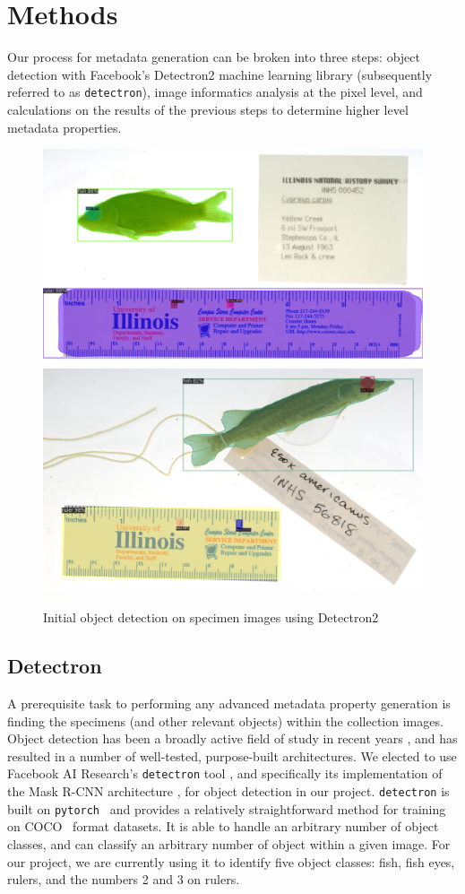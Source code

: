 \documentclass[conference]{IEEEtran}
\begin{document}
\section{Methods}
Our process for metadata generation can be broken into three steps: object detection with Facebook's Detectron2 machine learning library (subsequently referred to as \verb|detectron|), image informatics analysis at the pixel level, and calculations on the results of the previous steps to determine higher level metadata properties.

\begin{figure}[H]
  \centering
  \includegraphics[width=.49\linewidth]{images/teaser1_crop}
  \includegraphics[width=.49\linewidth]{images/teaser2_crop}
  \caption{Initial object detection on specimen images using Detectron2~\cite{wu2019detectron2}}
  \label{fig:teaser}
\end{figure}
\subsection{Detectron}
A prerequisite task to performing any advanced metadata property generation
is finding the specimens (and other relevant objects) within the collection
images. Object detection has been a broadly active field of study in recent
years \cite{zou2019object}, and has resulted in a number of well-tested, purpose-built architectures. We elected to use Facebook AI Research's \verb|detectron| tool \cite{wu2019detectron2}, and specifically its implementation of the Mask R-CNN architecture \cite{he2018mask}, for object detection in our project.
\verb|detectron| is built on \verb|pytorch|~\cite{NEURIPS2019_9015} and provides a relatively straightforward method for training on COCO~\cite{DBLP:journals/corr/LinMBHPRDZ14} format datasets. It is able to handle an arbitrary number of object classes, and can classify an arbitrary number of object within a given image. For our project, we are currently using it to identify five object classes: fish, fish eyes, rulers, and the numbers 2 and 3 on rulers.
\end{document}
